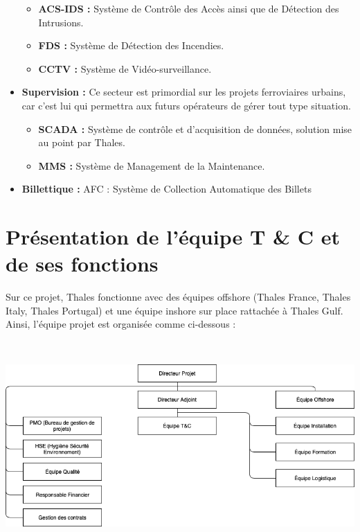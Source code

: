 \begin{itemize}
\begin{itemize}
\item \textbf{\gls{ACS-IDS} :} Système de Contrôle des Accès ainsi que de Détection des Intrusions.
\item \textbf{\gls{FDS} :} Système de Détection des Incendies.
\item \textbf{\gls{CCTV} :} Système de Vidéo-surveillance.
\end{itemize}
\item \textbf{Supervision :} Ce secteur est primordial sur les projets ferroviaires urbains, car c'est lui qui permettra aux futurs opérateurs de gérer tout type situation.
\begin{itemize}
\item \textbf{\gls{SCADA} :} Système de contrôle et d'acquisition de données, solution mise au point par Thales.
\item \textbf{\gls{MMS} :} Système de Management de la Maintenance.
\end{itemize}
\item \textbf{Billettique :} \gls{AFC} : Système de Collection Automatique des Billets
\end{itemize}


\section{Présentation de l'équipe T \& C et de ses fonctions}

Sur ce projet, Thales fonctionne avec des équipes offshore (Thales France, Thales Italy, Thales Portugal) et une équipe inshore sur place rattachée à Thales Gulf.
Ainsi, l'équipe projet est organisée comme ci-dessous :

\begin{center}
\includegraphics[height=8cm]{ressources/images/figures/OBS1.png}
\end{center}

